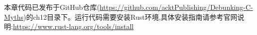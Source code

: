 本章代码已发布于GitHub仓库(\url{https://github.com/acktPublishing/Debunking-C-Myths})的ch12目录下。运行代码需要安装Rust环境,具体安装指南请参考官网说明:\url{https://www.rust-lang.org/tools/install}